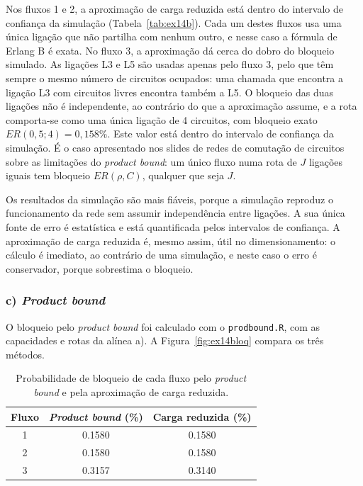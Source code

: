 \documentclass[10pt,a4paper]{article}
\begin{document}
Nos fluxos 1 e 2, a aproximação de carga reduzida está dentro do intervalo de confiança da simulação (Tabela~\ref{tab:ex14b}). Cada um destes fluxos usa uma única ligação que não partilha com nenhum outro, e nesse caso a fórmula de Erlang B é exata. No fluxo 3, a aproximação dá cerca do dobro do bloqueio simulado. As ligações L3 e L5 são usadas apenas pelo fluxo 3, pelo que têm sempre o mesmo número de circuitos ocupados: uma chamada que encontra a ligação L3 com circuitos livres encontra também a L5. O bloqueio das duas ligações não é independente, ao contrário do que a aproximação assume, e a rota comporta-se como uma única ligação de 4 circuitos, com bloqueio exato $ER(0{,}5;4)=0{,}158\%$. Este valor está dentro do intervalo de confiança da simulação. É o caso apresentado nos slides de redes de comutação de circuitos sobre as limitações do \textit{product bound}: um único fluxo numa rota de $J$ ligações iguais tem bloqueio $ER(\rho,C)$, qualquer que seja $J$.

Os resultados da simulação são mais fiáveis, porque a simulação reproduz o funcionamento da rede sem assumir independência entre ligações. A sua única fonte de erro é estatística e está quantificada pelos intervalos de confiança. A aproximação de carga reduzida é, mesmo assim, útil no dimensionamento: o cálculo é imediato, ao contrário de uma simulação, e neste caso o erro é conservador, porque sobrestima o bloqueio.

\subsubsection*{c) \textit{Product bound}}

O bloqueio pelo \textit{product bound} foi calculado com o \texttt{prodbound.R}, com as capacidades e rotas da alínea a). A Figura~\ref{fig:ex14bloq} compara os três métodos.

\begin{table}[H]
\centering
\begin{tabular}{cS[table-format=1.4]S[table-format=1.4]}
\toprule
Fluxo & {\textit{Product bound} (\%)} & {Carga reduzida (\%)}\\
 & 0.1580 & 0.1580\\
2 & 0.1580 & 0.1580\\
3 & 0.3157 & 0.3140\\
\bottomrule
\end{tabular}
\caption{Probabilidade de bloqueio de cada fluxo pelo \textit{product bound} e pela aproximação de carga reduzida.}
\label{tab:ex14c}
\end{table}
\end{document}
